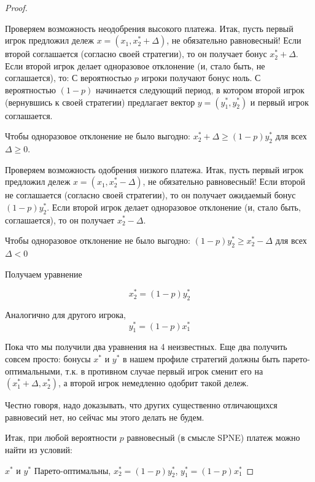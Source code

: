 \begin{proof}
\begin{myth}
\end{myth}


Проверяем возможность неодобрения высокого платежа. Итак, пусть первый
игрок предложил дележ $x=(x_{1},x_{2}^{*}+\Delta)$, не обязательно
равновесный! Если второй соглашается (согласно своей стратегии), то
он получает бонус $x_{2}^{*}+\Delta$. Если второй игрок делает одноразовое
отклонение (и, стало быть, не соглашается), то: С вероятностью $p$
игроки получают бонус ноль. С вероятностью $(1-p)$ начинается
следующий период, в котором второй игрок (вернувшись к своей стратегии)
предлагает вектор $y=(y_{1}^{*},y_{2}^{*})$ и первый игрок соглашается. 

Чтобы одноразовое отклонение не было выгодно: $x_{2}^{*}+\Delta\geq(1-p)y_{2}^{*}$
для всех $\Delta\geq0$. 

Проверяем возможность одобрения низкого платежа. Итак, пусть первый
игрок предложил дележ $x=(x_{1},x_{2}^{*}-\Delta)$, не обязательно
равновесный! Если второй не соглашается (согласно своей стратегии),
то он получает ожидаемый бонус $(1-p)y_{2}^{*}$. Если второй
игрок делает одноразовое отклонение (и, стало быть, соглашается),
то он получает $x_{2}^{*}-\Delta$.

Чтобы одноразовое отклонение не было выгодно: $(1-p)y_{2}^{*}\geq x_{2}^{*}-\Delta$
для всех $\Delta<0$

Получаем уравнение 

\begin{equation}
\label{eq:spne1}
x_{2}^{*}=(1-p)y_{2}^{*}
\end{equation}

Аналогично для другого игрока, 
\begin{equation}
\label{eq:spne2}
y_{1}^{*}=(1-p)x_{1}^{*}
\end{equation}



Пока что мы получили два уравнения на 4 неизвестных. Еще два получить
совсем просто: бонусы $x^{*}$ и $y^{*}$ в нашем профиле стратегий
должны быть парето-оптимальными, т.к. в противном случае первый игрок
сменит его на $(x_{1}^{*}+\Delta,x_{2}^{*})$, а второй игрок немедленно
одобрит такой дележ.

Честно говоря, надо доказывать, что других существенно отличающихся
равновесий нет, но сейчас мы этого делать не будем.

Итак, при любой вероятности $p$ равновесный (в смысле SPNE)
платеж можно найти из условий:

$x^{*}$ и $y^{*}$ Парето-оптимальны, $x_{2}^{*}=(1-p)y_{2}^{*}$,
$y_{1}^{*}=(1-p)x_{1}^{*}$ 


\end{proof}
